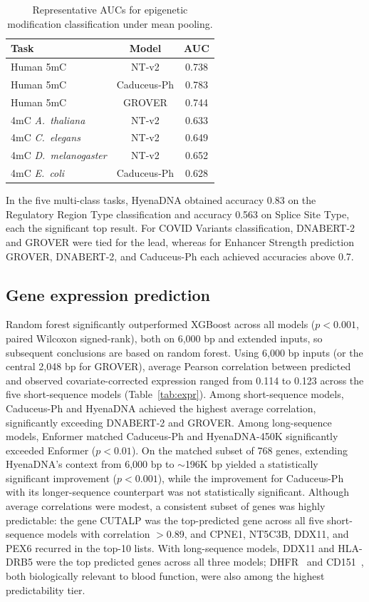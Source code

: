 \documentclass[11pt,a4paper]{article}
\begin{document}
\begin{table}[t]
\centering
\caption{Representative AUCs for epigenetic modification classification under mean pooling.}
\label{tab:epi}
\begin{tabular}{lcc}
\toprule
Task & Model & AUC \\
\midrule
Human 5mC                    & NT-v2       & 0.738 \\
Human 5mC                    & Caduceus-Ph & 0.783 \\
Human 5mC                    & GROVER      & 0.744 \\
4mC \emph{A.~thaliana}       & NT-v2       & 0.633 \\
4mC \emph{C.~elegans}        & NT-v2       & 0.649 \\
4mC \emph{D.~melanogaster}   & NT-v2       & 0.652 \\
4mC \emph{E.~coli}           & Caduceus-Ph & 0.628 \\
\bottomrule
\end{tabular}
\end{table}

In the five multi-class tasks, HyenaDNA obtained accuracy 0.83 on the Regulatory Region Type classification and accuracy 0.563 on Splice Site Type, each the significant top result. For COVID Variants classification, DNABERT-2 and GROVER were tied for the lead, whereas for Enhancer Strength prediction GROVER, DNABERT-2, and Caduceus-Ph each achieved accuracies above 0.7.

\subsection{Gene expression prediction}
Random forest significantly outperformed XGBoost across all models ($p<0.001$, paired Wilcoxon signed-rank), both on 6{,}000 bp and extended inputs, so subsequent conclusions are based on random forest. Using 6{,}000 bp inputs (or the central 2{,}048 bp for GROVER), average Pearson correlation between predicted and observed covariate-corrected expression ranged from 0.114 to 0.123 across the five short-sequence models (Table~\ref{tab:expr}). Among short-sequence models, Caduceus-Ph and HyenaDNA achieved the highest average correlation, significantly exceeding DNABERT-2 and GROVER. Among long-sequence models, Enformer matched Caduceus-Ph and HyenaDNA-450K significantly exceeded Enformer ($p<0.01$). On the matched subset of 768 genes, extending HyenaDNA's context from 6{,}000 bp to $\sim$196K bp yielded a statistically significant improvement ($p<0.001$), while the improvement for Caduceus-Ph with its longer-sequence counterpart was not statistically significant. Although average correlations were modest, a consistent subset of genes was highly predictable: the gene CUTALP was the top-predicted gene across all five short-sequence models with correlation $>$0.89, and CPNE1, NT5C3B, DDX11, and PEX6 recurred in the top-10 lists. With long-sequence models, DDX11 and HLA-DRB5 were the top predicted genes across all three models; DHFR~\citep{schweitzer2005dhfr} and CD151~\citep{hemler2001cd151}, both biologically relevant to blood function, were also among the highest predictability tier.
\end{document}
